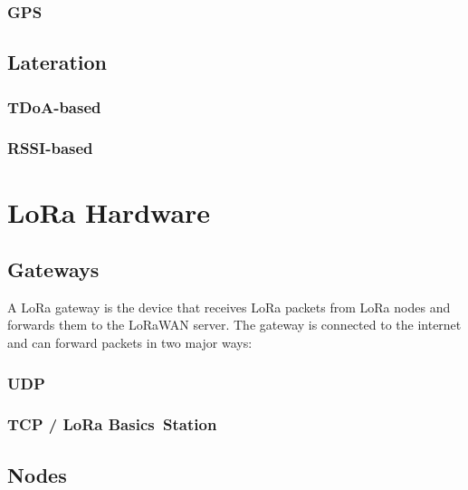 \subsubsection{\ac{GPS}}

\subsection{Lateration}

\subsubsection{\ac{TDoA}-based}

\subsubsection{\ac{RSSI}-based}

\section{\ac{LoRa} Hardware}

\subsection{Gateways}

A \ac{LoRa} gateway is the device that receives \ac{LoRa} packets from \ac{LoRa} nodes and forwards them to the \ac{LoRaWAN} server.
The gateway is connected to the internet and can forward packets in two major ways:

\subsubsection{\acf{UDP}}

\subsubsection{\acf{TCP} / LoRa Basics\texttrademark~Station}

\subsection{Nodes}